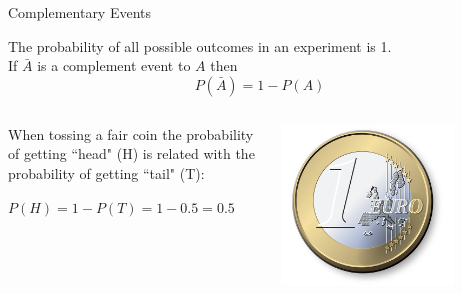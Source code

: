 \begin{frame}{Complementary Events}

    The probability of all possible outcomes in an experiment is 1. \\
    If $\bar{A}$ is a complement event to $A$ then
    \begin{equation}
    P(\bar{A}) = 1 - P(A)
    \end{equation}

    \begin{example}
    \medskip
    \begin{columns}
        \begin{column}{0.65\textwidth}
            
            When tossing a fair coin the probability of getting ``head" (H) is related with the probability of getting ``tail" (T):
            \medskip
            
            $P(H) = 1 - P(T) = 1 - 0.5 = 0.5$
        \end{column}
        \begin{column}{0.25\textwidth}
            \includegraphics[width=0.75\textwidth]{gfx/web/coin}
        \end{column}
    \end{columns}
    \end{example}

\end{frame}

